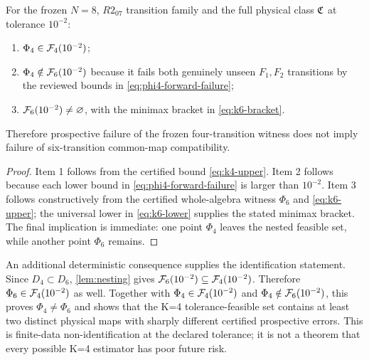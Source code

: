 \begin{proposition}
\label{prop:central}
For the frozen $N=8$, $R2_{07}$ transition family and the full physical class $\mathfrak C$ at tolerance $10^{-2}$:
\begin{enumerate}
\item $\Phi_4\in\mathcal F_4(10^{-2})$;
\item $\Phi_4\notin\mathcal F_6(10^{-2})$ because it fails both genuinely unseen $F_1,F_2$ transitions by the reviewed bounds in \cref{eq:phi4-forward-failure};
\item $\mathcal F_6(10^{-2})\neq\varnothing$, with the minimax bracket in \cref{eq:k6-bracket}.
\end{enumerate}
Therefore prospective failure of the frozen four-transition witness does not imply failure of six-transition common-map compatibility.
\end{proposition}

\begin{proof}
Item 1 follows from the certified bound \cref{eq:k4-upper}.  Item 2 follows because each lower bound in \cref{eq:phi4-forward-failure} is larger than $10^{-2}$.  Item 3 follows constructively from the certified whole-algebra witness $\Phi_6$ and \cref{eq:k6-upper}; the universal lower in \cref{eq:k6-lower} supplies the stated minimax bracket.  The final implication is immediate: one point $\Phi_4$ leaves the nested feasible set, while another point $\Phi_6$ remains.
\end{proof}

An additional deterministic consequence supplies the identification statement.  Since $D_4\subset D_6$, \cref{lem:nesting} gives $\mathcal F_6(10^{-2})\subseteq\mathcal F_4(10^{-2})$.  Therefore $\Phi_6\in\mathcal F_4(10^{-2})$ as well.  Together with $\Phi_4\in\mathcal F_4(10^{-2})$ and $\Phi_4\notin\mathcal F_6(10^{-2})$, this proves $\Phi_4\neq\Phi_6$ and shows that the K=4 tolerance-feasible set contains at least two distinct physical maps with sharply different certified prospective errors.  This is finite-data non-identification at the declared tolerance; it is not a theorem that every possible K=4 estimator has poor future risk.
